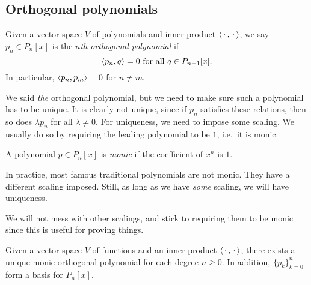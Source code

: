 \documentclass[a4paper]{article}
\begin{document}
\subsection{Orthogonal polynomials}
\begin{defi}
  Given a vector space $V$ of polynomials and inner product $\langle \,\cdot\,, \,\cdot\,\rangle$, we say $p_n \in P_n[x]$ is the \emph{$n$th orthogonal polynomial} if
  \[
    \langle p_n, q\rangle = 0\text{ for all }q \in P_{n - 1}[x].
  \]
  In particular, $\langle p_n, p_m\rangle = 0$ for $n \not= m$.
\end{defi}

We said \emph{the} orthogonal polynomial, but we need to make sure such a polynomial has to be unique. It is clearly not unique, since if $p_n$ satisfies these relations, then so does $\lambda p_n$ for all $\lambda \not= 0$. For uniqueness, we need to impose some scaling. We usually do so by requiring the leading polynomial to be $1$, i.e.\ it is monic.

\begin{defi}
  A polynomial $p \in P_n[x]$ is \emph{monic} if the coefficient of $x^n$ is $1$.
\end{defi}
In practice, most famous traditional polynomials are not monic. They have a different scaling imposed. Still, as long as we have \emph{some} scaling, we will have uniqueness.

We will not mess with other scalings, and stick to requiring them to be monic since this is useful for proving things.

\begin{thm}
  Given a vector space $V$ of functions and an inner product $\langle \,\cdot\,, \,\cdot\, \rangle$, there exists a unique monic orthogonal polynomial for each degree $n \geq 0$. In addition, $\{p_k\}_{k = 0}^n$ form a basis for $P_n[x]$.
\end{thm}
\end{document}
